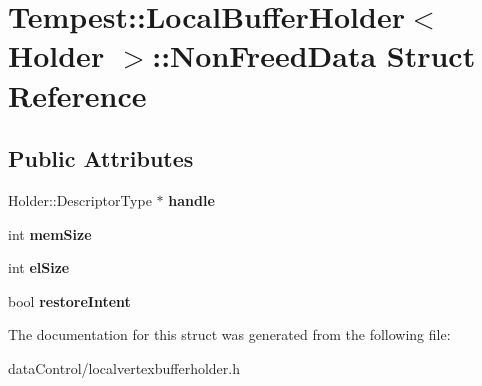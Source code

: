\hypertarget{struct_tempest_1_1_local_buffer_holder_1_1_non_freed_data}{\section{Tempest\+:\+:Local\+Buffer\+Holder$<$ Holder $>$\+:\+:Non\+Freed\+Data Struct Reference}
\label{struct_tempest_1_1_local_buffer_holder_1_1_non_freed_data}
}
\subsection*{Public Attributes}
\begin{DoxyCompactItemize}
\item 
\hypertarget{struct_tempest_1_1_local_buffer_holder_1_1_non_freed_data_a2bca51017688a8138fcf1fd018304cbf}{Holder\+::\+Descriptor\+Type $\ast$ {\bfseries handle}}\label{struct_tempest_1_1_local_buffer_holder_1_1_non_freed_data_a2bca51017688a8138fcf1fd018304cbf}

\item 
\hypertarget{struct_tempest_1_1_local_buffer_holder_1_1_non_freed_data_a225a995fda4f6b25c9587badd0091394}{int {\bfseries mem\+Size}}\label{struct_tempest_1_1_local_buffer_holder_1_1_non_freed_data_a225a995fda4f6b25c9587badd0091394}

\item 
\hypertarget{struct_tempest_1_1_local_buffer_holder_1_1_non_freed_data_aa738b06aa07f1ac9376b798a320a8af9}{int {\bfseries el\+Size}}\label{struct_tempest_1_1_local_buffer_holder_1_1_non_freed_data_aa738b06aa07f1ac9376b798a320a8af9}

\item 
\hypertarget{struct_tempest_1_1_local_buffer_holder_1_1_non_freed_data_abf136df1921b63bdbb6991ecd078b43e}{bool {\bfseries restore\+Intent}}\label{struct_tempest_1_1_local_buffer_holder_1_1_non_freed_data_abf136df1921b63bdbb6991ecd078b43e}

\end{DoxyCompactItemize}


The documentation for this struct was generated from the following file\+:\begin{DoxyCompactItemize}
\item 
data\+Control/localvertexbufferholder.\+h\end{DoxyCompactItemize}
